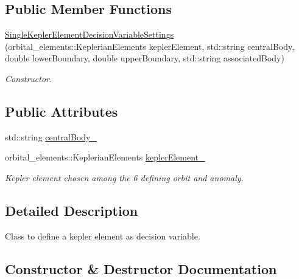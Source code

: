 \subsection*{Public Member Functions}
\begin{DoxyCompactItemize}
\item 
\hyperlink{structtudat_1_1optimization_1_1SingleKeplerElementDecisionVariableSettings_a11ff32aec7a2ed9a6f9d623b24081efc}{Single\+Kepler\+Element\+Decision\+Variable\+Settings} (orbital\+\_\+elements\+::\+Keplerian\+Elements kepler\+Element, std\+::string central\+Body, double lower\+Boundary, double upper\+Boundary, std\+::string associated\+Body)
\begin{DoxyCompactList}\small\item\em Constructor. \end{DoxyCompactList}\end{DoxyCompactItemize}
\subsection*{Public Attributes}
\begin{DoxyCompactItemize}
\item 
std\+::string \hyperlink{structtudat_1_1optimization_1_1SingleKeplerElementDecisionVariableSettings_a8758bf783611a52e2479f0f0e7a36ba0}{central\+Body\+\_\+}
\item 
orbital\+\_\+elements\+::\+Keplerian\+Elements \hyperlink{structtudat_1_1optimization_1_1SingleKeplerElementDecisionVariableSettings_ae4d07a0a1ae7e6f25579411680f6d76a}{kepler\+Element\+\_\+}\hypertarget{structtudat_1_1optimization_1_1SingleKeplerElementDecisionVariableSettings_ae4d07a0a1ae7e6f25579411680f6d76a}{}\label{structtudat_1_1optimization_1_1SingleKeplerElementDecisionVariableSettings_ae4d07a0a1ae7e6f25579411680f6d76a}

\begin{DoxyCompactList}\small\item\em Kepler element chosen among the 6 defining orbit and anomaly. \end{DoxyCompactList}\end{DoxyCompactItemize}


\subsection{Detailed Description}
Class to define a kepler element as decision variable. 

\subsection{Constructor \& Destructor Documentation}
